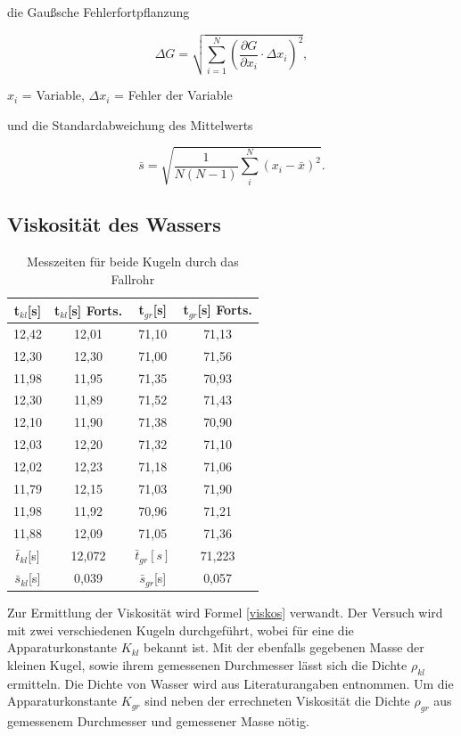 die Gaußsche Fehlerfortpflanzung

\begin{formel}
\begin{equation}
\Delta G = \sqrt{\sum_{i=1}^{N}\left( \frac{\partial G}{\partial x_i}\cdot \Delta x_i\right)^2},
\label{gauss}
\end{equation}
\caption*{$x_i$ = Variable, $\Delta x_i$ = Fehler der Variable}
\end{formel}

und die Standardabweichung des Mittelwerts

\begin{equation}
 \bar s = \sqrt{\frac{1}{N(N-1)} \sum_{i}^{N} (x_i - \bar{x})^2}.
\end{equation}

\subsection{Viskosität des Wassers}

\renewcommand{\arraystretch}{1.2}
\begin{table}[h]
 \begin{tabular}{c|c||c|c}
 t$_{kl}$[s] & t$_{kl}$[s] Forts. & t$_{gr}$[s] & t$_{gr}$[s] Forts.\\
 \hline
12,42&	12,01&	71,10&	71,13\\
12,30&	12,30&	71,00&	71,56\\
11,98&	11,95&	71,35&	70,93\\
12,30&	11,89&	71,52&	71,43\\
12,10&	11,90&	71,38&	70,90\\
12,03&	12,20&	71,32&	71,10\\
12,02&	12,23&	71,18&	71,06\\
11,79&	12,15&	71,03&	71,90\\
11,98&	11,92&	70,96&	71,21\\
11,88&	12,09&	71,05&	71,36\\
\hline
$\bar t_{kl}$[s] &12,072 &$\bar t_{gr}[s] $&71,223\\
$\bar s_{kl}$[s] & 0,039 & $\bar s_{gr}$[s] & 0,057
 \end{tabular}
\caption{Messzeiten für beide Kugeln durch das Fallrohr}
\label{tabviskos}
\end{table}
\renewcommand{\arraystretch}{1}

Zur Ermittlung der Viskosität wird Formel \eqref{viskos} verwandt. Der Versuch wird mit zwei verschiedenen Kugeln durchgeführt, wobei
für eine die Apparaturkonstante $K_{kl}$ bekannt ist. Mit der ebenfalls gegebenen Masse der kleinen Kugel, sowie ihrem gemessenen Durchmesser
lässt sich die Dichte $\rho_{kl}$ ermitteln. Die Dichte von Wasser wird aus Literaturangaben entnommen. Um die Apparaturkonstante 
$K_{gr}$ sind neben der errechneten Viskosität die Dichte $\rho_{gr}$ aus gemessenem Durchmesser und gemessener Masse nötig.


